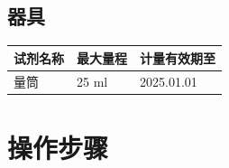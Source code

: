 \documentclass[UTF8,10pt,a4paper,fontset=fandol]{ctexart}
\newcommand{\fieldvalue}[1]{#1}
\newcommand{\handwritten}[1]{#1}
\begin{document}
\subsection{器具}

\begin{center}
\begin{tabular}{|p{}|p{}|p{}|}
\hline
试剂名称 & 最大量程 & 计量有效期至\\
\hline
量筒 &
\fieldvalue{\handwritten{25 ml}} &
\fieldvalue{\handwritten{2025.01.01}}\\
\hline
\end{tabular}
\end{center}

\section{操作步骤}
\end{document}
